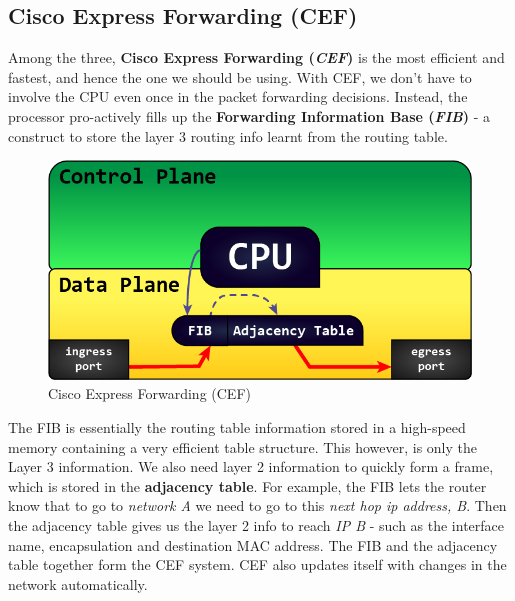 \subsection{Cisco Express Forwarding (CEF)}
Among the three, \textbf{Cisco Express Forwarding (\textit{CEF})} is the most efficient and fastest, and hence the one we should be using. With CEF, we don't have to involve the CPU even once in the packet forwarding decisions. Instead, the processor pro-actively fills up the \textbf{Forwarding Information Base (\textit{FIB})} - a construct to store the layer 3 routing info learnt from the routing table. 

\begin{figure}[H]
\centering
\includegraphics[width=0.5\linewidth]{"ICND1/2. Routers/chapters/7.4.c Cisco Express Forwarding"}
\caption{Cisco Express Forwarding (CEF)}
\label{fig:7.4.c}
\end{figure}
\vspace{-10pt}
\noindent
The FIB is essentially the routing table information stored in a high-speed memory containing a very efficient table structure. This however, is only the Layer 3 information. We also need layer 2 information to quickly form a frame, which is stored in the \textbf{adjacency table}.  For example, the FIB lets the router know that to go to \textit{network A} we need to go to this \textit{next hop ip address, B}. Then the adjacency table gives us the layer 2 info to reach \textit{IP B} - such as the interface name, encapsulation and destination MAC address. The FIB and the adjacency table together form the CEF system. CEF also updates itself with changes in the network automatically. 